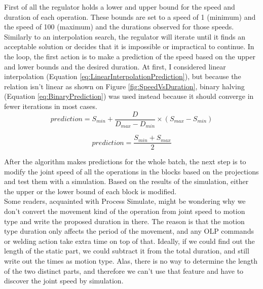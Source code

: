 
First of all the regulator holds a lower and upper bound for the speed and duration of each operation. These bounds are set to a speed of 1 (minimum) and the speed of 100 (maximum) and the durations observed for those speeds. Similarly to an interpolation search, the regulator will iterate until it finds an acceptable solution or decides that it is impossible or impractical to continue. In the loop, the first action is to make a prediction of the speed based on the upper and lower bounds and the desired duration. At first, I considered linear interpolation (Equation \ref{eq:LinearInterpolationPrediction}), but because the relation isn't linear as shown on Figure \ref{fig:SpeedVsDuration}, binary halving (Equation \ref{eq:BinaryPrediction}) was used instead because it should converge in fewer iterations in most cases. \\

\begin{equation} \label{eq:LinearInterpolationPrediction}
    prediction = S_{min} + \frac{D}{D_{max}-D_{min}} \times (S_{max}-S_{min})
\end{equation}

\begin{equation} \label{eq:BinaryPrediction}
    prediction = \frac{S_{min} + S_{max}}{2}
\end{equation}

After the algorithm makes predictions for the whole batch, the next step is to modify the joint speed of all the operations in the blocks based on the projections and test them with a simulation. Based on the results of the simulation, either the upper or the lower bound of each block is modified. \\

Some readers, acquainted with Process Simulate, might be wondering why we don't convert the movement kind of the operation from joint speed to motion type and write the proposed duration in there. The reason is that the motion type duration only affects the period of the movement, and any OLP commands or welding action take extra time on top of that. Ideally, if we could find out the length of the static part, we could subtract it from the total duration, and still write out the times as motion type. Alas, there is no way to determine the length of the two distinct parts, and therefore we can't use that feature and have to discover the joint speed by simulation. \\

